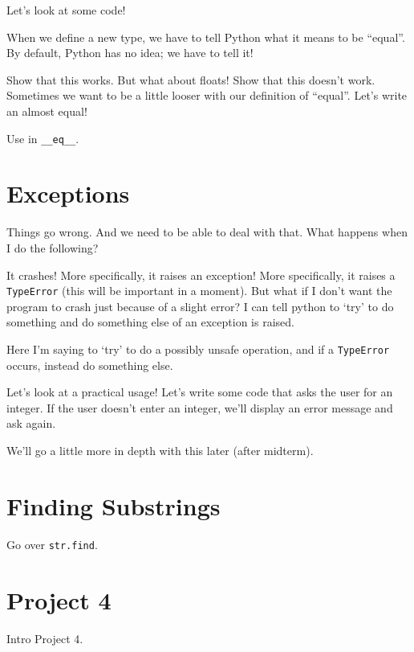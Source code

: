\documentclass[12pt]{article}
\begin{document}
Let's look at some code!



\noindent
When we define a new type, we have to tell Python what it means to be
``equal''.  By default, Python has no idea; we have to tell it!



\noindent
Show that this works.  But what about floats!  Show that this doesn't work.
Sometimes we want to be a little looser with our definition of ``equal''.
Let's write an almost equal!



\noindent
Use in \lstinline{__eq__}.

\section{Exceptions}

Things go wrong.  And we need to be able to deal with that.  What happens when
I do the following?



\noindent
It crashes!  More specifically, it raises an exception!  More specifically, it
raises a \lstinline{TypeError} (this will be important in a moment).  But what
if I don't want the program to crash just because of a slight error?  I can
tell python to `try' to do something and do something else of an exception is
raised.



\noindent
Here I'm saying to `try' to do a possibly unsafe operation, and if a
\lstinline{TypeError} occurs, instead do something else.

Let's look at a practical usage!  Let's write some code that asks the user for
an integer.  If the user doesn't enter an integer, we'll display an error
message and ask again.



\noindent
We'll go a little more in depth with this later (after midterm).

\section*{Finding Substrings}

Go over \lstinline{str.find}.

\section*{Project 4}

Intro Project 4.
\end{document}
